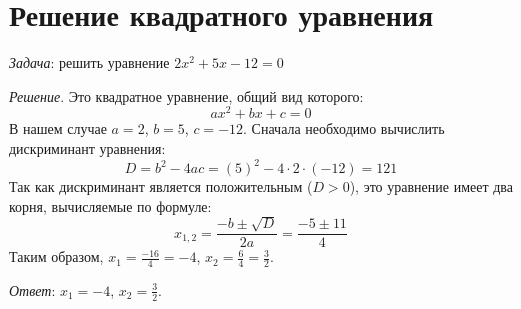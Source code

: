\documentclass{article}
\begin{document}
\section{Решение квадратного уравнения}

\textit{Задача}: решить уравнение $2x^2 + 5x - 12 = 0$

\textit{Решение}. Это квадратное уравнение, общий вид которого:
\[
ax^2 + bx + c = 0
\]
В нашем случае $a = 2$, $b = 5$, $c = -12$.
Сначала необходимо вычислить дискриминант уравнения:
\[
D = b^2 - 4ac = (5)^2 - 4 \cdot 2 \cdot (-12) = 121
\]
Так как дискриминант является положительным ($D > 0$), это уравнение имеет два корня, вычисляемые по формуле:
\[
x_{1,2} = \frac{-b \pm \sqrt{D}}{2a} = \frac{-5 \pm 11}{4}
\]
Таким образом, $x_1 = \frac{-16}{4} = -4$, $x_2 = \frac{6}{4} = \frac{3}{2}$.

\textit{Ответ}: $x_1 = -4$, $x_2 = \frac{3}{2}$.
\end{document}
